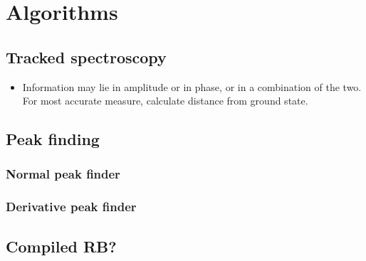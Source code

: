 \chapter{Algorithms}
\section{Tracked spectroscopy}
\label{sec:Tracked spectroscopy}
  \begin{itemize}
    \item Information may lie in amplitude or in phase, or in a combination of the two. For most accurate measure, calculate distance from ground state.
  \end{itemize}
\section{Peak finding}
  \subsection{Normal peak finder}
  \subsection{Derivative peak finder}
\section{Compiled RB?}